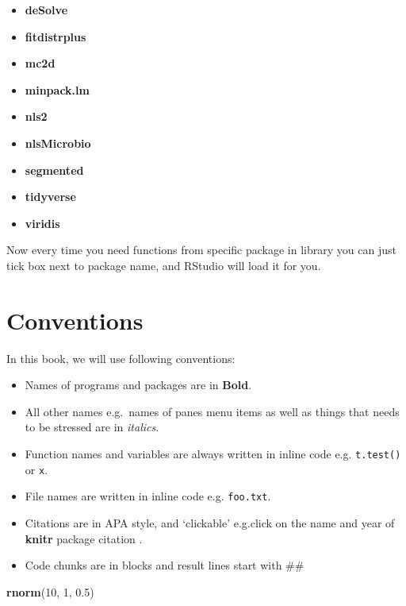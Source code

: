\documentclass[]{book}
\newenvironment{Shaded}{\begin{snugshade}}{\end{snugshade}}
\newcommand{\KeywordTok}[1]{\textcolor[rgb]{0.13,0.29,0.53}{\textbf{#1}}}
\newcommand{\DecValTok}[1]{\textcolor[rgb]{0.00,0.00,0.81}{#1}}
\newcommand{\FloatTok}[1]{\textcolor[rgb]{0.00,0.00,0.81}{#1}}
\newcommand{\NormalTok}[1]{#1}
\providecommand{\tightlist}{%
  \setlength{\itemsep}{0pt}\setlength{\parskip}{0pt}}
\theoremstyle{definition}
\theoremstyle{definition}
\theoremstyle{definition}
\theoremstyle{remark}
\begin{document}
\begin{itemize}
\tightlist
\item
  \textbf{deSolve} \citep{R-deSolve}
\item
  \textbf{fitdistrplus} \citep{R-fitdistrplus}
\item
  \textbf{mc2d} \citep{R-mc2d}
\item
  \textbf{minpack.lm} \citep{R-minpack.lm}
\item
  \textbf{nls2} \citep{R-nls2}
\item
  \textbf{nlsMicrobio} \citep{R-nlsMicrobio}
\item
  \textbf{segmented} \citep{R-segmented}
\item
  \textbf{tidyverse} \citep{R-tidyverse, R-dplyr, R-ggplot2, R-tidyr}
\item
  \textbf{viridis} \citep{R-viridis}
\end{itemize}

Now every time you need functions from specific package in library you
can just tick box next to package name, and RStudio will load it for
you.

\section{Conventions}\label{conventions}

In this book, we will use following conventions:

\begin{itemize}
\tightlist
\item
  Names of programs and packages are in \textbf{Bold}.
\item
  All other names e.g.~names of panes menu items as well as things that
  needs to be stressed are in \emph{italics}.
\item
  Function names and variables are always written in inline code e.g.
  \texttt{t.test()} or \texttt{x}.
\item
  File names are written in inline code e.g. \texttt{foo.txt}.
\item
  Citations are in APA style, and `clickable' e.g.click on the name and
  year of \textbf{knitr} package citation \citep{xie2015}.
\item
  Code chunks are in blocks and result lines start with \#\#
\end{itemize}

\begin{Shaded}
\begin{Highlighting}[]
\KeywordTok{rnorm}\NormalTok{(}\DecValTok{10}\NormalTok{, }\DecValTok{1}\NormalTok{, }\FloatTok{0.5}\NormalTok{)}
\end{Highlighting}
\end{Shaded}
\end{document}
